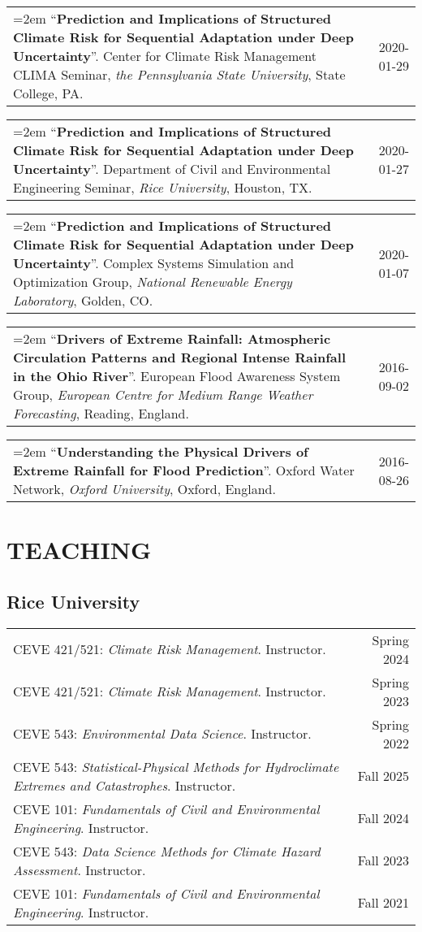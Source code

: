 \documentclass[10pt,oneside]{article}
\makeatletter
\newenvironment{alignedentries}[1][0pt]{%
  \noindent%
  \hspace{#1}%
  \begin{tabular*}{\dimexpr\textwidth-#1\relax}{@{}p{\dimexpr0.85\textwidth-#1\relax}@{\extracolsep{\fill}}r@{}}%
    }{%
  \end{tabular*}%
}
\newenvironment{alignedentrieshang}[1][2em]{%
  \noindent%
}{%
}
\newcommand{\hangingitem}[2]{%
  \noindent%
  \begin{tabular*}{\textwidth}{@{}p{0.85\textwidth}@{\extracolsep{\fill}}r@{}}%
    \hangindent=2em \hangafter=1 #1 & #2%
  \end{tabular*}%
}
\newcommand{\entryitem}[2]{#1 & #2}
\newcommand{\entrybreak}{\\}
\makeatother
\begin{document}
\begin{alignedentrieshang}
\hangingitem{\enquote{\textbf{Prediction and Implications of Structured Climate Risk for Sequential Adaptation under Deep Uncertainty}}. Center for Climate Risk Management CLIMA Seminar,  \textit{the Pennsylvania State University}, State College, PA.}{2020-01-29}

\hangingitem{\enquote{\textbf{Prediction and Implications of Structured Climate Risk for Sequential Adaptation under Deep Uncertainty}}. Department of Civil and Environmental Engineering Seminar,  \textit{Rice University}, Houston, TX.}{2020-01-27}

\hangingitem{\enquote{\textbf{Prediction and Implications of Structured Climate Risk for Sequential Adaptation under Deep Uncertainty}}. Complex Systems Simulation and Optimization Group,  \textit{National Renewable Energy Laboratory}, Golden, CO.}{2020-01-07}

\hangingitem{\enquote{\textbf{Drivers of Extreme Rainfall: Atmospheric Circulation Patterns and Regional Intense Rainfall in the Ohio River}}. European Flood Awareness System Group,  \textit{European Centre for Medium Range Weather Forecasting}, Reading, England.}{2016-09-02}

\hangingitem{\enquote{\textbf{Understanding the Physical Drivers of Extreme Rainfall for Flood Prediction}}. Oxford Water Network,  \textit{Oxford University}, Oxford, England.}{2016-08-26}

\end{alignedentrieshang}


\section{TEACHING}


\subsection{Rice University}
\begin{alignedentries}[2em]

\entryitem{CEVE 421/521: \textit{Climate Risk Management}. Instructor.}{Spring 2024}\entrybreak

\entryitem{CEVE 421/521: \textit{Climate Risk Management}. Instructor.}{Spring 2023}\entrybreak

\entryitem{CEVE 543: \textit{Environmental Data Science}. Instructor.}{Spring 2022}\entrybreak

\entryitem{CEVE 543: \textit{Statistical-Physical Methods for Hydroclimate Extremes and Catastrophes}. Instructor.}{Fall 2025}\entrybreak

\entryitem{CEVE 101: \textit{Fundamentals of Civil and Environmental Engineering}. Instructor.}{Fall 2024}\entrybreak

\entryitem{CEVE 543: \textit{Data Science Methods for Climate Hazard Assessment}. Instructor.}{Fall 2023}\entrybreak

\entryitem{CEVE 101: \textit{Fundamentals of Civil and Environmental Engineering}. Instructor.}{Fall 2021}

\end{alignedentries}
\end{document}
